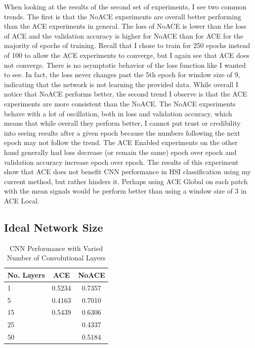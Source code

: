 \documentclass[12pt]{article}
\begin{document}
When looking at the results of the second set of experiments, I see two common trends.
%
The first is that the NoACE experiments are overall better performing than the ACE experiments in general.
%
The loss of NoACE is lower than the loss of ACE and the validation accuracy is higher for NoACE than for ACE for the majority of epochs of training.
%
Recall that I chose to train for 250 epochs instead of 100 to allow the ACE experiments to converge, but I again see that ACE does not converge.
%
There is no asymptotic behavior of the loss function like I wanted to see.
%
In fact, the loss never changes past the 5th epoch for window size of 9, indicating that the network is not learning the provided data.
%
While overall I notice that NoACE performs better, the second trend I observe is that the ACE experiments are more consistent than the NoACE.
%
The NoACE experiments behave with a lot of oscillation, both in loss and validation accuracy, which means that while overall they perform better, I cannot put trust or credibility into seeing results after a given epoch because the numbers following the next epoch may not follow the trend.
%
The ACE Enabled experiments on the other hand generally had loss decrease (or remain the same) epoch over epoch and validation accuracy increase epoch over epoch. 
%
The results of this experiment show that ACE does not benefit CNN performance in HSI classification using my current method, but rather hinders it.
%
Perhaps using ACE Global on each patch with the mean signals would be perform better than using a window size of 3 in ACE Local.

\subsection{Ideal Network Size}

\begin{table}[t]
	
	\centering
	
	\caption{CNN Performance with Varied Number of Convolutional Layers}
	\label{table:cnn}
	\begin{tabular}{l | c | c }
		\textbf{No. Layers} & \textbf{ACE} & \textbf{NoACE} \\			
		\hline	
		1 & 0.5234 & 0.7357 \\
		5 & 0.4163 & 0.7010 \\
		15 & 0.5439 & 0.6306 \\
		25 & & 0.4337 \\
		50 & & 0.5184 \\
		
	\end{tabular}	
	
\end{table}
\end{document}
